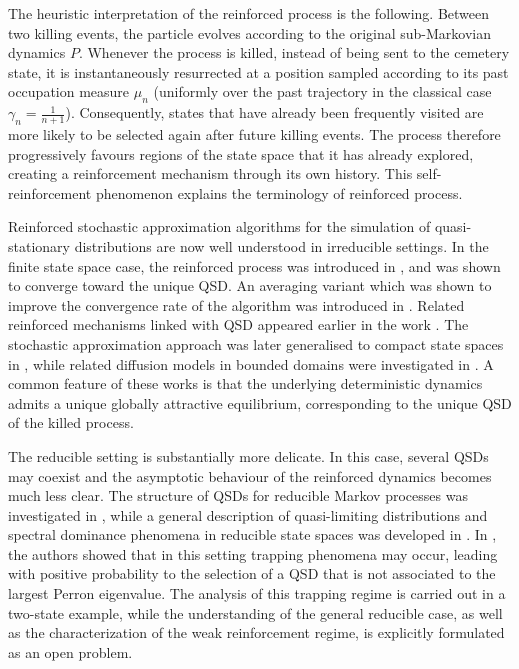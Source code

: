 \documentclass[10pt,letterpaper]{article}
\theoremstyle{compactplain}
\theoremstyle{compactdefinition}
\newcommand{\1}{\mathds{1}}
\begin{document}
\medskip{}

The heuristic interpretation of the reinforced process is the following. Between two killing events, the particle evolves according to the original sub-Markovian dynamics $P$. Whenever the process is killed, instead of being sent to the cemetery state, it is instantaneously resurrected at a position sampled according to its past occupation measure $\mu_n$ (uniformly over the past trajectory in the classical case $\gamma_n=\frac1{n+1}$). Consequently, states that have already been frequently visited are more likely to be selected again after future killing events. The process therefore progressively favours regions of the state space that it has already explored, creating a reinforcement mechanism through its own history. This self-reinforcement phenomenon explains the terminology of reinforced process.

\medskip

Reinforced stochastic approximation algorithms for the simulation of quasi-stationary distributions are now well understood in irreducible settings. In the finite state space case, the reinforced process was introduced in \cite{BC2015}, and was shown to converge toward the unique QSD. An averaging variant which was shown to improve the convergence rate of the algorithm was introduced in \cite{blanchet2016analysis}. Related reinforced mechanisms linked with QSD appeared earlier in the work \cite{AFP}. The stochastic approximation approach was later generalised to compact state spaces in \cite{benaim2018stochastic}, while related diffusion models in bounded domains were investigated in \cite{benaim2021stochastic, panloup2026asymptotically}. A common feature of these works is that the underlying deterministic dynamics admits a unique globally attractive equilibrium, corresponding to the unique QSD of the killed process.

\medskip{}

The reducible setting is substantially more delicate. In this case, several QSDs may coexist and the asymptotic behaviour of the reinforced dynamics becomes much less clear. The structure of QSDs for reducible Markov processes was investigated in \cite{pollett2008quasi}, while a general description of quasi-limiting distributions and spectral dominance phenomena in reducible state spaces was developed in \cite{champagnat2022quasi}. In \cite{benaim2018stochastic}, the authors showed that in this setting trapping phenomena may occur, leading with positive probability to the selection of a QSD that is not associated to the largest Perron eigenvalue. The analysis of this trapping regime is carried out in a two-state example, while the understanding of the general reducible case, as well as the characterization of the weak reinforcement regime, is explicitly formulated as an open problem.
\end{document}
